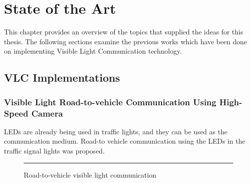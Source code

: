 
\chapter{State of the Art} %

\label{SoA} %


This chapter provides an overview of the topics that supplied the ideas for this thesis. The
following sections examine the previous works which have been done on implementing
Visible Light Communication technology.


\section{VLC Implementations}

\subsection{Visible Light Road-to-vehicle Communication Using High-Speed Camera}

LEDs are already being used in traffic lights, and they can be used as the communication
medium. Road-to vehicle communication using the LEDs in the traffic signal lights was
proposed.

\begin{figure}[htbp]
  \centering
    \rule{35em}{0.5pt}
  \caption[Road-to-vehicle visible light communication]{Road-to-vehicle visible light communication}
  \label{fig:vlc-road}
\end{figure}

